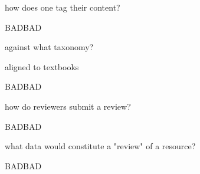 \documentclass{chalkboard}
\begin{document}
\begin{frame}
\end{frame}

\begin{frame}
\end{frame}

\begin{frame}
\end{frame}

\clearbackgroundpicture

\begin{frame}
  how does one tag their content?

  BADBAD
\end{frame}

\begin{frame}
against what taxonomy?  

aligned to textbooks

  BADBAD
\end{frame}

\begin{frame}
how do reviewers submit a review?  

  BADBAD
\end{frame}

\begin{frame}
what data would constitute a "review" of a resource?

  BADBAD
\end{frame}

\begin{frame}
\end{frame}

\begin{frame}
\end{frame}

\begin{frame}
\end{frame}

\begin{frame}
\end{frame}

\begin{frame}
\end{frame}
\end{document}
